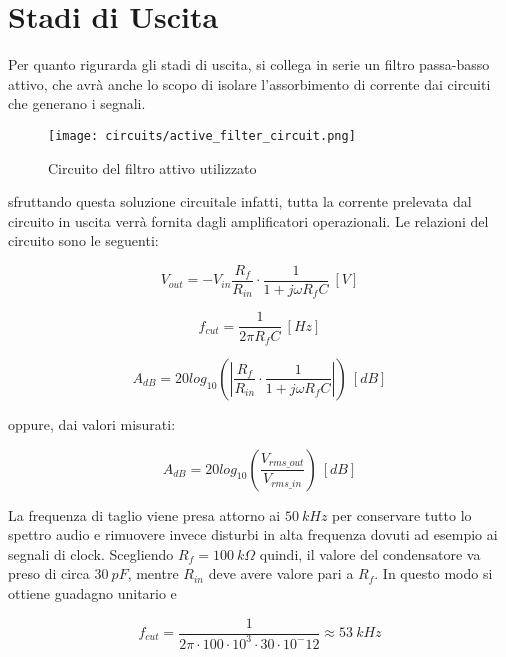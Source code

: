\chapter{Stadi di Uscita}


Per quanto rigurarda gli stadi di uscita, si collega in serie un filtro passa-basso attivo,
che avrà anche lo scopo di isolare l'assorbimento di corrente dai circuiti che generano i
segnali.

\begin{figure}[H]
    \centering
    \texttt{[image: circuits/active\_filter\_circuit.png]}
    \caption{Circuito del filtro attivo utilizzato}
    \label{active_filter_circuit}
\end{figure}

sfruttando questa soluzione circuitale infatti, tutta la corrente prelevata dal circuito in
uscita verrà fornita dagli amplificatori operazionali. Le relazioni del circuito sono le
seguenti:

\begin{equation}\label{active_filter}
    V_{out}=-V_{in}\frac{R_f}{R_{in}}\cdot\frac{1}{1+j\omega R_fC}\ [V]
\end{equation}

\begin{equation}\label{fcut}
    f_{cut}=\frac{1}{2\pi R_fC}\ [Hz]
\end{equation}

\begin{equation}\label{gain1}
    A_{dB}=20log_{10}\left(\left|\frac{R_f}{R_{in}}\cdot\frac{1}{1+j\omega R_fC}\right|\right)\ [dB]
\end{equation}

oppure, dai valori misurati:

\begin{equation}\label{gain2}
    A_{dB}=20log_{10}\left(\frac{V_{rms\_out}}{V_{rms\_in}}\right)\ [dB]
\end{equation}

La frequenza di taglio viene presa attorno ai $50\ kHz$ per conservare tutto lo spettro audio
e rimuovere invece disturbi in alta frequenza dovuti ad esempio ai segnali di clock.
Scegliendo $R_f=100\ k\Omega$ quindi, il valore del condensatore va preso di circa $30\ pF$,
mentre $R_{in}$ deve avere valore pari a $R_f$. In questo modo si ottiene guadagno unitario e

\begin{equation}
    f_{cut}=\frac{1}{2\pi\cdot100\cdot10^3\cdot30\cdot10^-12}\approx53\ kHz
\end{equation}


